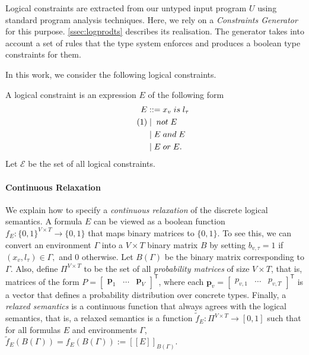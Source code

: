 \documentclass[acmsmall, review, anonymous]{acmart}\settopmatter{printfolios=true,printccs=false,printacmref=false}
\newcommand{\qqpi}[2]{[\![#2]\!]_{#1}}
\newcommand\numberthis{\addtocounter{equation}{1}\tag{\theequation}}
\begin{document}

Logical constraints are extracted from our untyped input program $U$ using
standard program analysis techniques.  Here, we rely on a \emph{Constraints
	Generator} for this purpose.   \autoref{ssec:logprodts} describes its
realisation.  The generator takes into account a set of rules that the type system
enforces and produces a boolean type constraints for them.

In this work, we consider the following logical constraints.
\begin{definition}\label{def:log-gram}
	A logical constraint is an expression $E$ of the following form
	\begin{align*}
		E & ::= x_v \mathrel{is} l_\tau \\ \numberthis\label{eq:gram}
		  & \mid{} \mathrel{not} E      \\
		  & \mid E \mathrel{and} E      \\
		  & \mid E \mathrel{or} E.
	\end{align*}
	Let $\mathcal{E}$ be the set of all logical constraints.
\end{definition}
\paragraph{Continuous Relaxation}
We explain how to specify a \emph{continuous relaxation} of the discrete logical semantics.
A formula $E$ can be viewed as a boolean function $f_E: \{0, 1\}^{V \times T} \rightarrow \{0, 1\}$
that maps binary matrices to $\{0, 1\}$.
To see this, we can convert an environment
$\Gamma$ into a $V \times T$ binary matrix $B$ by setting $b_{v,\tau} = 1$ if
$(x_v, l_\tau) \in \Gamma,$ and 0 otherwise.
Let $B(\Gamma)$ be the binary
matrix corresponding to $\Gamma$.
Also, define $\Pi^{V \times T}$ to be the set
of all \emph{probability matrices} of size $V \times T$,
that is, matrices of the form $P = \begin{bmatrix} \bm{p}_1 & \ldots & \bm{p}_{V} \end{bmatrix}^\mathsf{T}$,
where each $\bm{p}_v = \begin{bmatrix} p_{v,1} & \ldots & p_{v,{T}} \end{bmatrix}^\mathsf{T}$
is a vector that defines a probability distribution over concrete types.
Finally, a \emph{relaxed semantics} is a continuous function
that always agrees with the logical semantics, that is,
a relaxed semantics is a function
$\tilde{f}_{E} : \Pi^{V \times T}  \rightarrow [0, 1]$
such that for all formulas $E$ and environments $\Gamma$,
$\tilde{f}_{E}(B(\Gamma)) = f_E(B(\Gamma)) := \qqpi{B(\Gamma)}{E}$.
\end{document}
